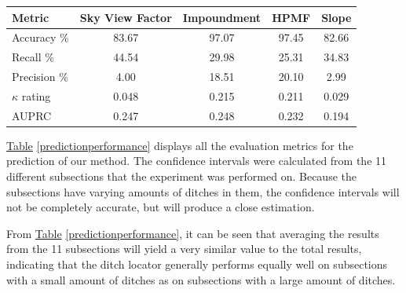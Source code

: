 \documentclass[]{interact}
\theoremstyle{plain}%
\theoremstyle{definition}
\theoremstyle{remark}
\begin{document}
\begin{table}[!htb]
    {\begin{tabular}{lcccc} \toprule
        Metric & Sky View Factor & Impoundment & HPMF & Slope\\ \midrule
        Accuracy \%     & 83.67 & 97.07 & 97.45 & 82.66 \\
        Recall \%       & 44.54 & 29.98 & 25.31 & 34.83 \\
        Precision \%    &{ 4.00}  & 18.51 & 20.10 & { 2.99} \\
        $\kappa$ rating & 0.048 & 0.215 & 0.211 & 0.029 \\
        AUPRC & 0.247 & 0.248 & 0.232 & 0.194 \\ \bottomrule
    \end{tabular}}
    \label{recreatedpredictionperformance}
\end{table}

\hyperref[predictionperformance]{Table} \ref{predictionperformance} displays all the evaluation metrics for the prediction of our method. The confidence intervals were calculated from the 11 different subsections that the experiment was performed on. Because the subsections have varying amounts of ditches in them, the confidence intervals will not be completely accurate, but will produce a close estimation.

From \hyperref[predictionperformance]{Table} \ref{predictionperformance}, it can be seen that averaging the results from the 11 subsections will yield a very similar value to the total results, indicating that the ditch locator generally performs equally well on subsections with a small amount of ditches as on subsections with a large amount of ditches.
\end{document}
